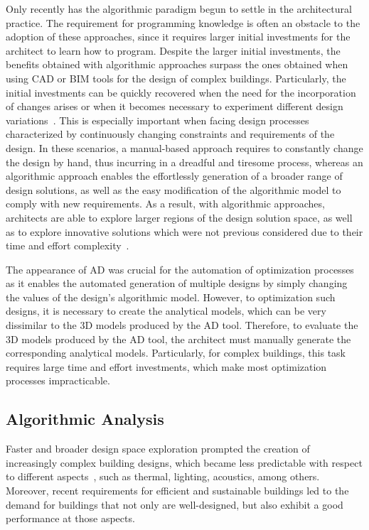 Only recently has the algorithmic paradigm begun to settle in the architectural practice. The requirement for programming knowledge is often an obstacle to the adoption of these approaches, since it requires larger initial investments for the architect to learn how to program. Despite the larger initial investments, the benefits obtained with algorithmic approaches surpass the ones obtained when using \ac{CAD} or \ac{BIM} tools for the design of complex buildings. Particularly, the initial investments can be quickly recovered when the need for the incorporation of changes arises or when it becomes necessary to experiment different design variations~\cite{Leitao2014GD}. This is especially important when facing design processes characterized by continuously changing constraints and requirements of the design. In these scenarios, a manual-based approach requires to constantly change the design by hand, thus incurring in a dreadful and tiresome process, whereas an algorithmic approach enables the effortlessly generation of a broader range of design solutions, as well as the easy modification of the algorithmic model to comply with new requirements. As a result, with algorithmic approaches, architects are able to explore larger regions of the design solution space, as well as to explore innovative solutions which were not previous considered due to their time and effort complexity~\cite{Leitao2014GD}. 

The appearance of \ac{AD} was crucial for the automation of optimization processes as it enables the automated generation of multiple designs by simply changing the values of the design's algorithmic model. However, to optimization such designs, it is necessary to create the analytical models, which can be very dissimilar to the 3D models produced by the \ac{AD} tool. Therefore, to evaluate the 3D models produced by the \ac{AD} tool, the architect must manually generate the corresponding analytical models. Particularly, for complex buildings, this task requires large time and effort investments, which make most optimization processes impracticable.

\subsection{Algorithmic Analysis}

Faster and broader design space exploration prompted the creation of increasingly complex building designs, which became less predictable with respect to different aspects~\cite{Branco2017AD}, such as thermal, lighting, acoustics, among others. Moreover, recent requirements for efficient and sustainable buildings led to the demand for buildings that not only are well-designed, but also exhibit a good performance at those aspects.
	

